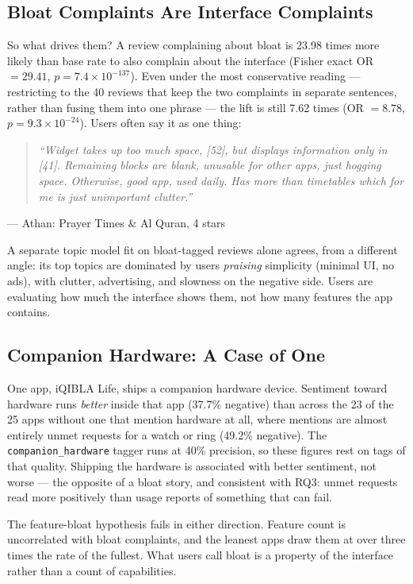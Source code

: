 \subsection{Bloat Complaints Are Interface Complaints}

So what drives them? A review complaining about bloat is 23.98 times more
likely than base rate to also complain about the interface (Fisher exact
OR \(=29.41\), \(p=7.4\times10^{-137}\)). Even under the most conservative
reading --- restricting to the 40 reviews that keep the two complaints in
separate sentences, rather than fusing them into one phrase --- the lift is
still 7.62 times (OR \(=8.78\), \(p=9.3\times10^{-24}\)). Users often say it
as one thing:

\begin{quote}
\itshape ``Widget takes up too much space, [5\texttimes{}2], but displays
information only in [4\texttimes{}1]. Remaining blocks are blank, unusable for
other apps, just hogging space. Otherwise, good app, used daily. Has more than
timetables which for me is just unimportant clutter.''
\end{quote}
\hspace*{1em}--- Athan: Prayer Times \& Al Quran, 4 stars

A separate topic model fit on bloat-tagged reviews alone agrees, from a
different angle: its top topics are dominated by users \emph{praising}
simplicity (minimal UI, no ads), with clutter, advertising, and slowness on
the negative side. Users are evaluating how much the interface shows them, not
how many features the app contains.

\subsection{Companion Hardware: A Case of One}

One app, iQIBLA Life, ships a companion hardware device. Sentiment toward
hardware runs \emph{better} inside that app (37.7\% negative) than across the
23 of the 25 apps without one that mention hardware at all, where mentions are
almost entirely unmet requests for a watch or ring (49.2\% negative). The \texttt{companion\_hardware} tagger runs
at 40\% precision, so these figures rest on tags of that quality. Shipping the
hardware is associated with better sentiment, not worse --- the opposite of a
bloat story, and consistent with RQ3: unmet requests read more positively than
usage reports of something that can fail.

The feature-bloat hypothesis fails in either direction. Feature count is
uncorrelated with bloat complaints, and the leanest apps draw them at over
three times the rate of the fullest. What users call bloat is a property of
the interface rather than a count of capabilities.
